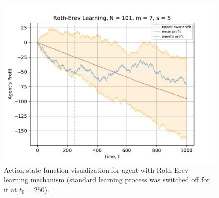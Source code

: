 \documentclass[12pt,american,czech]{article}
\begin{document}
\begin{figure}[ht!]
\centering
\includegraphics[width=0.8\linewidth]{Images/figure_1}
\caption{Action-state function visualization for agent with Roth-Erev learning mechanism (standard learning process was switched off for it at $t_{0}=250$).}
\label{fig:figure_5}
\end{figure}


\newpage{}



%

\end{document}
